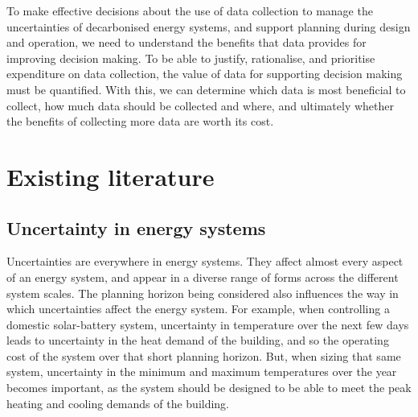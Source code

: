 To make effective decisions about the use of data collection to manage the uncertainties of decarbonised energy systems, and support planning during design and operation, we need to understand the benefits that data provides for improving decision making. To be able to justify, rationalise, and prioritise expenditure on data collection, the value of data for supporting decision making must be quantified. With this, we can determine which data is most beneficial to collect, how much data should be collected and where, and ultimately whether the benefits of collecting more data are worth its cost.



\newpage
\section{Existing literature}


\subsection{Uncertainty in energy systems} \label{sec:uncertainties-lit}


Uncertainties are everywhere in energy systems. They affect almost every aspect of an energy system, and appear in a diverse range of forms across the different system scales. The planning horizon being considered also influences the way in which uncertainties affect the energy system. For example, when controlling a domestic solar-battery system, uncertainty in temperature over the next few days leads to uncertainty in the heat demand of the building, and so the operating cost of the system over that short planning horizon. But, when sizing that same system, uncertainty in the minimum and maximum temperatures over the year becomes important, as the system should be designed to be able to meet the peak heating and cooling demands of the building.


